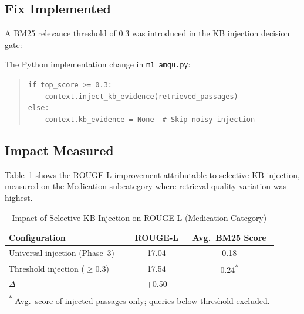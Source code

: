 \documentclass[a4paper,12pt]{article}
\begin{document}
\subsection{Fix Implemented}

A BM25 relevance threshold of $0.3$ was introduced in the KB injection
decision gate:

\begin{center}
\end{center}

The Python implementation change in \texttt{m1\_amqu.py}:
\begin{quote}\small
\texttt{if top\_score >= 0.3:}\\
\texttt{\ \ \ \ context.inject\_kb\_evidence(retrieved\_passages)}\\
\texttt{else:}\\
\texttt{\ \ \ \ context.kb\_evidence = None}~~\texttt{\# Skip noisy injection}
\end{quote}

\subsection{Impact Measured}

Table~\ref{tab:fix2_impact} shows the ROUGE-L improvement attributable
to selective KB injection, measured on the Medication subcategory where
retrieval quality variation was highest.

\begin{table}[h]
\centering
\caption{Impact of Selective KB Injection on ROUGE-L (Medication Category)}
\label{tab:fix2_impact}
\begin{tabular}{lcc}
\toprule
\textbf{Configuration} & \textbf{ROUGE-L} & \textbf{Avg.\ BM25 Score} \\
\midrule
Universal injection (Phase~3)  & 17.04 & 0.18 \\
Threshold injection ($\geq$0.3) & 17.54 & 0.24\textsuperscript{*} \\
\midrule
$\Delta$ & $+$0.50 & --- \\
\bottomrule
\multicolumn{3}{l}{\scriptsize \textsuperscript{*} Avg.\ score of injected
  passages only; queries below threshold excluded.}
\end{tabular}
\end{table}
\end{document}
